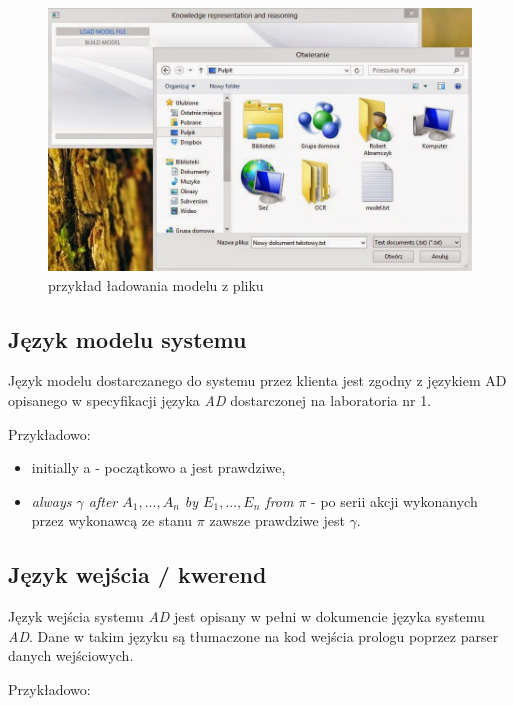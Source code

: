 \documentclass[a4paper]{article}
\begin{document}
        \begin{figure}[p]
            \centering
            \includegraphics[width=\textwidth]{images/acomp_3.jpg}
            \caption{przykład ładowania modelu z pliku}
            \label{fig:acomp3}
        \end{figure}

    \subsection{Język modelu systemu}
        Język modelu dostarczanego do systemu przez klienta jest zgodny
        z językiem AD opisanego w specyfikacji języka \textit{AD} dostarczonej
        na laboratoria nr 1.

        Przykładowo:

        \begin{itemize}
            \item initially a - początkowo a jest prawdziwe,
            \item \textit{always $\gamma$ after $A_1, ... , A_n$ by 
                $E_1, ..., E_n$ from $\pi$} - po serii akcji wykonanych przez
                wykonawcą ze stanu $\pi$ zawsze prawdziwe jest $\gamma$.
        \end{itemize}

    \subsection{Język wejścia / kwerend}
        Język wejścia systemu \textit{AD} jest opisany w pełni w dokumencie 
        języka systemu \textit{AD}. Dane w takim języku są tłumaczone na kod
        wejścia prologu poprzez parser danych wejściowych.


    Przykładowo:
      
\end{document}

